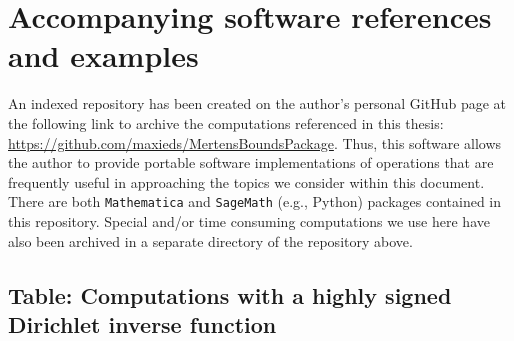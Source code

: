 \documentclass[11pt,reqno,a4letter]{article}
\numberwithin{figure}{section}
\numberwithin{table}{section}
\theoremstyle{plain}
\numberwithin{theorem}{section}
\theoremstyle{definition}
\begin{document}
     \vskip -0.35in
     \printglossary[type={symbols},title={},style={glossstyleSymbol},nogroupskip=true]

\newpage
\section{Accompanying software references and examples} 
\label{Appendix_SoftwarePackages} 

An indexed repository has been created on the 
author's personal GitHub page at the following link to archive the 
computations referenced in this thesis: 
\href{https://github.com/maxieds/MertensBoundsPackage}{\url{https://github.com/maxieds/MertensBoundsPackage}}. 
Thus, this software allows the author to provide portable software implementations 
of operations that are frequently useful in approaching the topics we consider within this 
document. There are both \texttt{Mathematica} and \texttt{SageMath} (e.g., Python) packages 
contained in this repository. Special and/or time consuming computations we use here have also 
been archived in a separate directory of the repository above. 

\newpage
\renewcommand{\thesubsection}{T.\arabic{subsection}}
\subsection{Table: Computations with a highly signed Dirichlet inverse function} 
\label{table_conjecture_Mertens_ginvSeq_approx_values}
\end{document}
